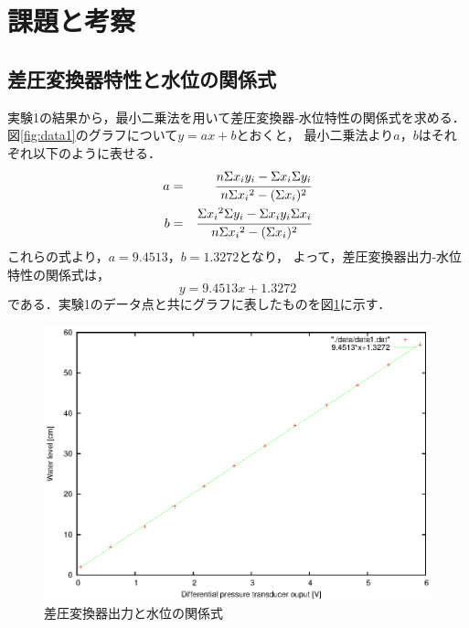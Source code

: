 \documentclass[11pt,a4paper]{jsarticle}
\begin{document}
\section{課題と考察}

\setcounter{equation}{0}
\setcounter{figure}{0}
\setcounter{table}{0}

\subsection{差圧変換器特性と水位の関係式}

実験1の結果から，最小二乗法を用いて差圧変換器-水位特性の関係式を求める．
図\ref{fig:data1}のグラフについて$y = a x + b$とおくと，
最小二乗法より$a$，$b$はそれぞれ以下のように表せる．
\begin{eqnarray}
  a &=& \cfrac{n \Sigma x_i y_i - \Sigma x_i \Sigma y_i}{n \Sigma {x_i}^2 - ( \Sigma x_i )^2} \\
  \vspace{5mm}
  b &=& \cfrac{\Sigma {x_i}^2 \Sigma y_i - \Sigma x_i y_i \Sigma x_i}{n \Sigma {x_i}^2 - ( \Sigma x_i )^2}
\end{eqnarray}
これらの式より，$a = 9.4513$，$b = 1.3272$となり，
よって，差圧変換器出力-水位特性の関係式は，
\begin{equation}
  y = 9.4513 x + 1.3272
\end{equation}
である．実験1のデータ点と共にグラフに表したものを図\ref{fig:least_square}に示す．

\begin{figure}[b]
  \begin{center}
    \includegraphics[width=0.9\hsize]{./data/least_square.eps}
  \end{center}
  \caption{差圧変換器出力と水位の関係式}
  \label{fig:least_square}
\end{figure}
\end{document}
